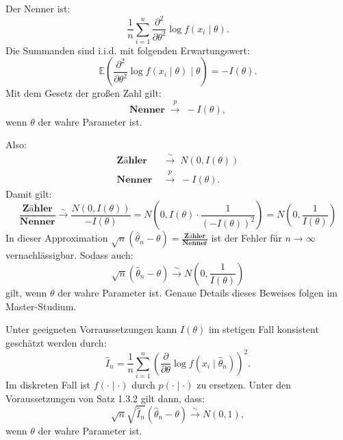 \documentclass[10pt]{article}
\newcommand{\EW}{\mathbb{E}} %
\newcommand{\KW}{\overset{p} \longrightarrow} %
\newcommand{\KV}{\overset{\sim} \longrightarrow} %
\newcommand{\ablt}{\frac{\partial}{\partial \theta}}
\newenvironment{BWS}[1][]
{\begin{Beweis}[frametitle=#1]}{\end{Beweis}}
\begin{document}
\begin{BWS}[Beweisidee 1.3.6 (Verteilung des Schätzfehlers)]
		Der Nenner ist:
		\begin{equation*}
			\frac{1}{n} \sum_{i=1}^{n} \frac{\partial^2}{\partial \theta^2} \log f(x_i \mid \theta).
		\end{equation*}
		Die Summanden sind i.i.d. mit folgenden Erwartungswert:
		\begin{equation*}
			\EW \left(\frac{\partial^2}{\partial \theta^2} \log f(x_i \mid \theta) \mid \theta \right) = -I(\theta).
		\end{equation*}
		Mit dem Gesetz der großen Zahl gilt:
		\begin{equation*}
			\textbf{Nenner} \; \KW \; -I(\theta),
		\end{equation*}
		wenn $\theta$ der wahre Parameter ist. 
		
		Also: 
		\begin{equation*}
			\begin{split}
				\textbf{Zähler} \; &\KV \; N(0,I(\theta))\\
				\textbf{Nenner} \; &\KW \; -I(\theta).
			\end{split}
		\end{equation*}
		Damit gilt:
		\begin{equation*}
			\frac{\textbf{Zähler}}{\textbf{Nenner}} \KV \frac{N(0,I(\theta))}{-I(\theta)} = N\left(0, I(\theta) \cdot \frac{1}{(-I(\theta))^2}\right) = N\left(0, \frac{1}{I(\theta)}\right)
		\end{equation*}
		In dieser Approximation $\sqrt{n}(\hat{\theta}_n - \theta) = \frac{\textbf{Zähler}}{\textbf{Nenner}}$ ist der Fehler für $n \rightarrow \infty$ vernachlässigbar. Sodass auch:
		\begin{equation*}
			\sqrt{n}(\hat{\theta}_n - \theta)  \KV N\left(0, \frac{1}{I(\theta)}\right)
		\end{equation*}
		gilt, wenn $\theta$ der wahre Parameter ist. Genaue Details dieses Beweises folgen im Master-Studium. 
	\end{BWS}
	Unter geeigneten Vorraussetzungen kann $I(\theta)$ im stetigen Fall konsistent geschätzt werden durch:
	\begin{equation*}
		\hat{I}_n = \frac{1}{n} \sum_{i=1}^{n}\left(\ablt \log f(x_i\mid \hat{\theta}_n)\right)^2.
	\end{equation*}
	Im diskreten Fall ist $f(\cdot \mid \cdot)$ durch $p(\cdot \mid \cdot)$ zu ersetzen.
	Unter den Voraussetzungen von Satz 1.3.2 gilt dann, dass:
	\begin{equation*}
		\sqrt{n} \sqrt{\hat{I}_n}(\hat{\theta}_n - \theta) \KV N(0,1),
	\end{equation*}
	wenn $\theta$ der wahre Parameter ist. 
	
\end{document}
